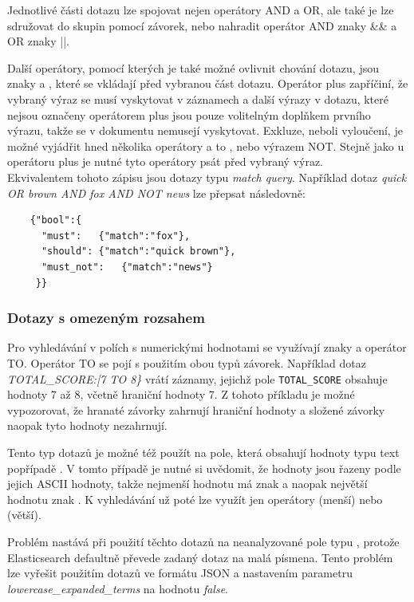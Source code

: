 \documentclass[czech,BP]{thesiskiv}
\begin{document}
Jednotlivé části dotazu lze spojovat nejen operátory AND a OR, ale také je lze sdružovat do skupin pomocí závorek, nebo nahradit operátor AND znaky \&\& a OR znaky ||.


Další operátory, pomocí kterých je také možné ovlivnit chování dotazu, jsou znaky \uv{+} a \uv{-}, které se vkládají před vybranou část dotazu. Operátor plus zapříčiní, že vybraný výraz se musí vyskytovat v záznamech a další výrazy v dotazu, které nejsou označeny operátorem plus jsou pouze volitelným doplňkem prvního výrazu, takže se v dokumentu nemusejí vyskytovat. Exkluze, neboli vyloučení, je možné vyjádřit hned několika operátory a to \uv{-}, \uv{!} nebo výrazem NOT. Stejně jako u operátoru plus je nutné tyto operátory psát před vybraný výraz.
\\
Ekvivalentem tohoto zápisu jsou dotazy typu \textit{match query}. Například dotaz \textit{quick OR brown AND fox AND NOT news} lze přepsat následovně:
			

	\begin{lstlisting}
	{"bool":{
	  "must":	{"match":"fox"},
	  "should":	{"match":"quick brown"},
	  "must_not":	{"match":"news"}
	 }}
	\end{lstlisting}
	
\subsubsection{Dotazy s omezeným rozsahem}	
Pro vyhledávání v polích s numerickými hodnotami se využívají znaky \uv{\{\}, [], <, >, =}  a operátor TO. Operátor TO se pojí s použitím obou typů závorek. Například dotaz \textit{TOTAL\_SCORE:[7 TO 8\}} vrátí záznamy, jejichž pole \texttt{TOTAL\_SCORE} obsahuje hodnoty 7 až 8, včetně hraniční hodnoty 7. Z tohoto příkladu je možné vypozorovat, že hranaté závorky zahrnují hraniční hodnoty a složené závorky naopak tyto hodnoty nezahrnují.


Tento typ dotazů je možné též použít na pole, která obsahují hodnoty typu text popřípadě . V tomto případě je nutné si uvědomit, že hodnoty jsou řazeny podle jejich ASCII hodnoty, takže nejmenší hodnotu má znak  a naopak největší hodnotu znak . K vyhledávání už poté lze využít jen operátory \uv{<} (menší) nebo \uv{>} (větší).


Problém nastává při použití těchto dotazů na neanalyzované pole typu , protože Elasticsearch defaultně převede zadaný dotaz na malá písmena. Tento problém lze vyřešit použitím dotazů ve formátu JSON a nastavením parametru \textit{lowercase\_expanded\_terms} na hodnotu \textit{false}.
\end{document}

